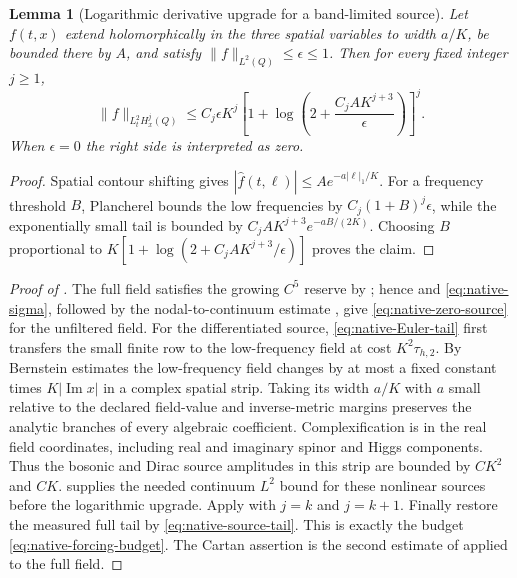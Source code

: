 \documentclass[11pt]{article}
\numberwithin{equation}{section}
\newtheorem{lemma}[lemma]{Lemma}
\theoremstyle{definition}
\theoremstyle{remark}
\newcommand{\norm}[1]{\lVert#1\rVert}
\begin{document}
\begin{lemma}[Logarithmic derivative upgrade for a band-limited source]
\label{lem:log-source-upgrade}
Let $f(t,x)$ extend holomorphically in the three spatial variables to width $a/K$, be bounded there by $A$, and satisfy $\norm f_{L^2(Q)}\le\epsilon\le1$.  Then for every fixed integer $j\ge1$,
\begin{equation}
 \norm f_{L^2_tH_x^j(Q)}
 \le C_j\epsilon K^j
 \left[1+\log\left(2+\frac{C_jAK^{j+3}}\epsilon\right)\right]^j.
 \label{eq:log-source-upgrade}
\end{equation}
When $\epsilon=0$ the right side is interpreted as zero.
\end{lemma}
\begin{proof}
Spatial contour shifting gives $|\widehat f(t,\ell)|\le Ae^{-a|\ell|_1/K}$.  For a frequency threshold $B$, Plancherel bounds the low frequencies by $C_j(1+B)^j\epsilon$, while the exponentially small tail is bounded by $C_jAK^{j+3}e^{-aB/(2K)}$.  Choosing $B$ proportional to $K[1+\log(2+C_jAK^{j+3}/\epsilon)]$ proves the claim.
\end{proof}

\begin{proof}[Proof of ]
The full field satisfies the growing $C^5$ reserve by ; hence  and \eqref{eq:native-sigma}, followed by the nodal-to-continuum estimate , give \eqref{eq:native-zero-source} for the unfiltered field.  For the differentiated source, \eqref{eq:native-Euler-tail} first transfers the small finite row to the low-frequency field at cost $K^2\tau_{h,2}$.  By Bernstein estimates the low-frequency field changes by at most a fixed constant times $K|\operatorname{Im}x|$ in a complex spatial strip.  Taking its width $a/K$ with $a$ small relative to the declared field-value and inverse-metric margins preserves the analytic branches of every algebraic coefficient.  Complexification is in the real field coordinates, including real and imaginary spinor and Higgs components.  Thus the bosonic and Dirac source amplitudes in this strip are bounded by $CK^2$ and $CK$.   supplies the needed continuum $L^2$ bound for these nonlinear sources before the logarithmic upgrade.  Apply  with $j=k$ and $j=k+1$.  Finally restore the measured full tail by \eqref{eq:native-source-tail}.  This is exactly the budget \eqref{eq:native-forcing-budget}.  The Cartan assertion is the second estimate of  applied to the full field.
\end{proof}
\end{document}
